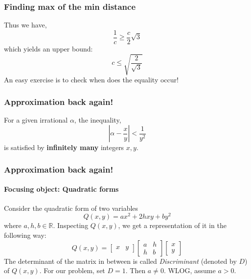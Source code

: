 \documentclass{beamer}
\begin{document}

    \begin{frame}
        \frametitle{Finding max of the min distance}
        Thus we have, \[\frac{1}{c} \geq \frac{c}{2}\sqrt{3}\] which yields an upper bound: \[\boxed{c \leq \sqrt{\frac{2}{\sqrt{3}}}}\]
        An easy exercise is to check when does the equality occur!
    \end{frame}

    \begin{frame}
        \frametitle{Approximation back again!}
        \begin{theorem}
            For a given irrational \(\alpha\), the inequality, \[\left|\alpha - \frac{x}{y}\right| < \frac{1}{y^2}\] is satisfied by \textbf{infinitely many} integers \(x,y\).
        \end{theorem}
    \end{frame}

    \begin{frame}
        \frametitle{Approximation back again!}
        \framesubtitle{Focusing object: Quadratic forms}
        Consider the quadratic form of two variables \[Q(x,y) = ax^2 + 2hxy + by^2\] where \(a,h,b \in \mathbb{R}\). Inspecting \(Q(x,y)\), we get a representation of it in the following way: \pause \[Q(x,y) = \begin{bmatrix}
            x & y
        \end{bmatrix}
        \begin{bmatrix}
            a & h \\
            h & b
        \end{bmatrix}
        \begin{bmatrix}
            x \\
            y
        \end{bmatrix}\]
        The determinant of the matrix in between is called \emph{Discriminant} (denoted by \(D\)) of \(Q(x,y)\). For our problem, set \(D = 1\). Then \(a \neq 0\). WLOG, assume \(a > 0\).
    \end{frame}
\end{document}

